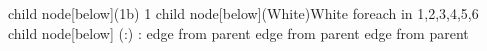       child {
            node[below](1b) {1}
            child {
                  node[below](White){White}
                  foreach \a in {1,2,3,4,5,6}
                  {
                     child {
                           node[below] (\a:) {\a:}
                           edge from parent
                     }
                  }
            edge from parent
            } 
      edge from parent
      }  
